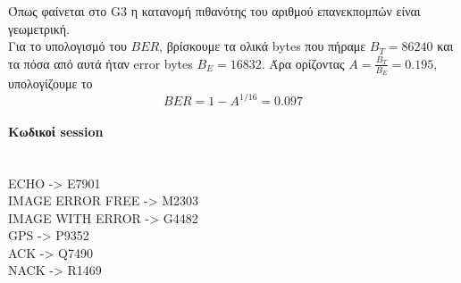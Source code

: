 \documentclass{article}
\begin{document}
Όπως φαίνεται στο G3 η κατανομή πιθανότης του αριθμού επανεκπομπών είναι
γεωμετρική.
\\
Για το υπολογισμό του $BER$, βρίσκουμε τα ολικά bytes που πήραμε $B_T = 86240$
και τα πόσα από αυτά ήταν error bytes $B_E = 16832$. Άρα ορίζοντας $A =
\frac{B_T}{B_E} = 0.195$, υπολογίζουμε το $$BER = 1 - A^{1 /16} = 0.097$$

\pagebreak
\paragraph{Κωδικοί session}\hfill\\
ECHO -> E7901\\
IMAGE ERROR FREE -> M2303\\
IMAGE WITH ERROR -> G4482\\
GPS -> P9352\\
ACK -> Q7490\\
NACK -> R1469\\
\end{document}
